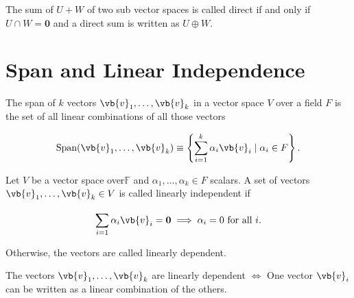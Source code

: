 \documentclass[a4paper,12pt]{report}
\begin{document}
The sum of \(U+W\) of two sub vector spaces is called direct if and only if \(U \cap W = {\boldsymbol{0} }\) and a direct sum is written as \(U \oplus W\).   

\section{Span and Linear Independence}

\begin{definition}
    The span of \(k\) vectors \(\vb{v} _{1} , \ldots , \vb{v} _{k} \) in a vector space \(V\) over a field \(F\) is the set of all linear combinations of all those vectors
\end{definition}

\begin{equation}
    \text{Span} (\vb{v} _{1}, \ldots ,\vb{v} _{k}  ) \equiv  \left\{\sum_{i=1}^{k} \alpha _{i}\vb{v} _{i} \mid  \alpha _{i}\in F    \right\}.
\end{equation}

\begin{definition}
Let \(V\) be a vector space over\(\mathbb{F}\) and \(\alpha _{1}, \ldots , \alpha _{k} \in  F  \) scalars. A set of vectors \(\vb{v} _{1}, \ldots , \vb{v} _{k} \in V\) is called linearly independent if 

\begin{equation}
    \sum_{i=1}^{} \alpha _{i} \vb{v} _{i} = \boldsymbol{0} \implies \alpha _{i} = 0 \text{ for all } i.      
\end{equation}

Otherwise, the vectors are called linearly dependent. 
\end{definition}

\begin{corollary}
The vectors \(\vb{v} _{1}, \ldots , \vb{v} _{k}  \) are linearly dependent \(\iff \) One vector \(\vb{v} _{i} \) can be written as a linear combination of the others. 
\end{corollary}
\end{document}
